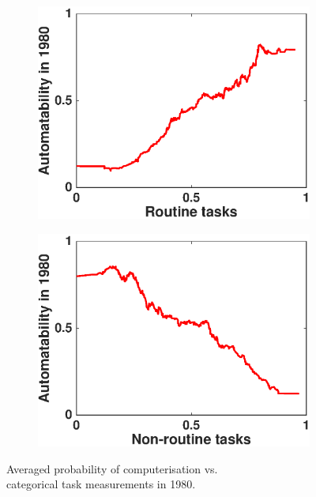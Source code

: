 \documentclass[11pt]{report}
\numberwithin{equation}{chapter}
\begin{document}
\begin{spacing}{2}
\begin{figure}[htb]
\begin{subfigure}{0.48\textwidth}
\centering
	\includegraphics[scale = 0.5]{routine.eps}
\end{subfigure}%
\begin{subfigure}{0.48\textwidth}
\centering
	\includegraphics[scale = 0.5]{non-routine.eps}
\end{subfigure}

\caption{Averaged probability of computerisation vs. \\categorical task measurements in 1980.}
\label{fig:1980cat}
\end{figure}


\end{spacing}
\end{document}
